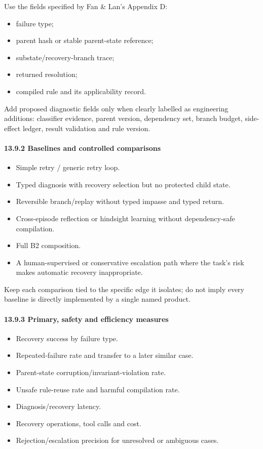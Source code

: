 Use the fields specified by Fan \& Lan's Appendix D:

\begin{itemize}
\tightlist
\item
  failure type;
\item
  parent hash or stable parent-state reference;
\item
  substate/recovery-branch trace;
\item
  returned resolution;
\item
  compiled rule and its applicability record.
\end{itemize}

Add proposed diagnostic fields only when clearly labelled as engineering additions: classifier evidence, parent version, dependency set, branch budget, side-effect ledger, result validation and rule version.

\paragraph{13.9.2 Baselines and controlled comparisons}\label{baselines-and-controlled-comparisons}

\begin{itemize}
\tightlist
\item
  Simple retry / generic retry loop.
\item
  Typed diagnosis with recovery selection but no protected child state.
\item
  Reversible branch/replay without typed impasse and typed return.
\item
  Cross-episode reflection or hindsight learning without dependency-safe compilation.
\item
  Full B2 composition.
\item
  A human-supervised or conservative escalation path where the task's risk makes automatic recovery inappropriate.
\end{itemize}

Keep each comparison tied to the specific edge it isolates; do not imply every baseline is directly implemented by a single named product.

\paragraph{13.9.3 Primary, safety and efficiency measures}\label{primary-safety-and-efficiency-measures}

\begin{itemize}
\tightlist
\item
  Recovery success by failure type.
\item
  Repeated-failure rate and transfer to a later similar case.
\item
  Parent-state corruption/invariant-violation rate.
\item
  Unsafe rule-reuse rate and harmful compilation rate.
\item
  Diagnosis/recovery latency.
\item
  Recovery operations, tool calls and cost.
\item
  Rejection/escalation precision for unresolved or ambiguous cases.
\end{itemize}

